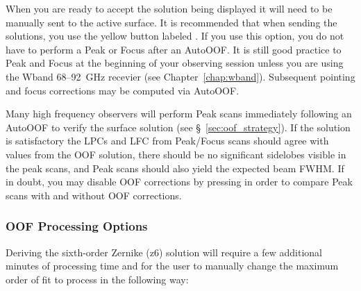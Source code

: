 When you are ready to accept the solution being displayed it will need to be manually
sent to the active surface.  It is recommended that when sending the solutions, you use
the yellow button labeled
.
If you use this option, you do not have to perform a Peak or Focus after an AutoOOF.
It is still good practice to Peak and Focus at the beginning of your observing session
unless you are using the \gls{Wband} 68--92~GHz recevier (see Chapter~\ref{chap:wband}).
Subsequent pointing and focus corrections may be computed via AutoOOF.

Many high frequency observers will perform Peak scans immediately following
an AutoOOF to verify the surface solution (see \S~\ref{sec:oof_strategy}).
If the solution is satisfactory the \glspl{LPC} and \gls{LFC} from Peak/Focus
scans should agree with values from the \gls{OOF} solution, there should be no significant
sidelobes visible in the peak scans, and Peak scans should also yield the expected
beam \gls{FWHM}. If in doubt, you may disable \gls{OOF} corrections by pressing
 in order to compare
Peak scans with and without \gls{OOF} corrections.

\subsubsection{OOF Processing Options}\label{sec:OOFprocessing}
\vspace{-2.5mm}

Deriving the sixth-order Zernike (z6) solution will require a few additional minutes of
processing time and for the user to manually change the maximum order of fit to process
in the following way:

